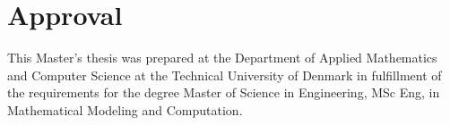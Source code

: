 \section*{Approval}

This Master's thesis was prepared at the Department of Applied Mathematics and Computer Science at the Technical University of Denmark in fulfillment of the requirements for the degree Master of Science in Engineering, MSc Eng, in Mathematical Modeling and Computation.


\vfill

\begin{center}
\namesigdate{\thesisauthor~-~\studentnumber}
\end{center}

\vfill

